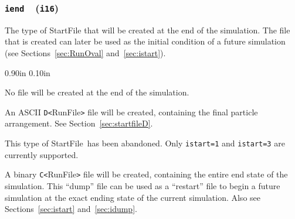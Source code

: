 \documentclass[letterpaper,11pt]{article}
\newcommand{\Var}[2]{\texttt{#1}\ \  (\texttt{#2})}
\newcommand{\StartFile}{\textsf{StartFile}}
\newlength{\Labelwidth}
\newcommand{\Entrylabel}[1]{\makebox[\Labelwidth][r]{\texttt{#1}}}
\newenvironment{Options}
{\begin{list}{}{%
\renewcommand{\makelabel}{\Entrylabel}%
\setlength{\leftmargin} {0.90in}%
\setlength{\rightmargin}{0.00in}%
\setlength{\labelsep}   {0.10in}%
\setlength{\labelwidth} {\Labelwidth}%
}}
{\end{list}}
\begin{document}
\subsubsection[\texttt{iend}]{\Var{iend}{i16}}\label{sec:iend}
The type of \textsf{StartFile} that will be created at the
end of the simulation.
The file that is created can later be used as the
initial condition of a future simulation 
(see Sections~\ref{sec:RunOval} and~\ref{sec:istart}).
%
\begin{Options}
\item[iend=0]
No file will be created at the end of the simulation.
\item[iend=1]
An ASCII \mbox{\texttt{D<}\textsf{RunFile}\texttt{>}} file
will be created, containing the final particle arrangement.
See Section~\ref{sec:startfileD}.
\item[iend=2]
This type of \StartFile\ has been abandoned.
Only \texttt{istart=1} and \texttt{istart=3} are currently
supported.
\item[iend=3]
A binary \mbox{\texttt{C<}\textsf{RunFile}\texttt{>}} file
will be created, containing the entire end state of the simulation.
This ``dump'' file can be used as a ``restart'' file to begin a future
simulation at the exact ending state
of the current simulation.
Also see Sections~\ref{sec:istart} and~\ref{sec:idump}.
\end{Options}
%
\end{document}
